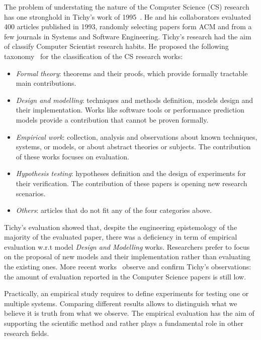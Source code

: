 The problem of understating the nature of the Computer Science (CS) research has one stronghold in Tichy's work of 1995~\cite{Tichy:1995:EEC:209090.209093}. He and his collaborators evaluated 400 articles published in 1993, randomly selecting papers form ACM and from a few journals in Systems and Software Engineering. Tichy's research had the aim of classify Computer Scientist research habits. He proposed the following taxonomy~\cite{Tichy:1995:EEC:209090.209093} for the classification of the CS research works:
\begin{itemize}
\item \textit{Formal theory}: theorems and their proofs, which provide formally tractable main contributions. 
\item \textit{Design and modelling}:  techniques and methods definition, models design and their implementation. Works like  software tools or performance prediction models provide a contribution that cannot be proven formally.
\item \textit{Empirical work}: collection, analysis and observations about known techniques, systems, or models, or about abstract theories or subjects. The contribution of these works focuses on evaluation.
\item \textit{Hypothesis testing}: hypotheses definition and the design of experiments for their verification. The contribution of these papers is opening new research scenarios.
\item \textit{Others}: articles that do not fit any of the four categories above.
\end{itemize}

Tichy's evaluation showed that, despite the engineering epistemology of the majority of the evaluated paper, there was a deficiency in term of empirical evaluation w.r.t model \textit{Design and Modelling} works. Researchers prefer to focus on the proposal of new models and their implementation rather than evaluating the existing ones. More recent works~\cite{Wainer:2009:EEC:1518331.1518552} observe and confirm Tichy's observations: the amount of evaluation reported in the Computer Science papers is still low.

Practically, an empirical study requires to define experiments for testing one or multiple systems. Comparing different results allows to distinguish what we believe it is truth from what we observe. The empirical evaluation has the aim of supporting the scientific method and rather plays a fundamental role in other research fields.

